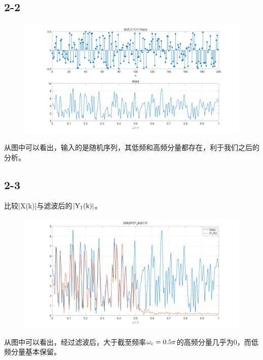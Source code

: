 \documentclass{../source/Experiment}
\begin{document}
        \subsection{2-2}
            \begin{figure}[H]
                \centering
                \includegraphics[width = 1\textwidth]{src/exp4-2-2.png}
            \end{figure}
            从图中可以看出，输入的是随机序列，其低频和高频分量都存在，利于我们之后的分析。
        \subsection{2-3}
            比较|X(k)|与滤波后的$\rm |Y_1(k)|$。
            \begin{figure}[H]
                \centering
                \includegraphics[width = 1\textwidth]{src/exp4-2-3-1.png}
            \end{figure}
            从图中可以看出，经过滤波后，大于截至频率$\rm \omega _c = 0.5 \pi$的高频分量几乎为0，而低频分量基本保留。
\end{document}
